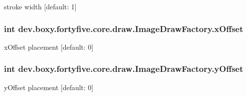 \label{d8/d0b/group___image_draw_ga55543d51eec3d277bc6141062937ac94}
stroke width \mbox{[}default: 1\mbox{]} \hypertarget{group___image_draw_ga6be37b38c2cff42f387e0357b769f6df}{
\subsubsection[{xOffset}]{\setlength{\rightskip}{0pt plus 5cm}int {\bf dev.boxy.fortyfive.core.draw.ImageDrawFactory.xOffset}}}
\label{d8/d0b/group___image_draw_ga6be37b38c2cff42f387e0357b769f6df}
xOffset placement \mbox{[}default: 0\mbox{]} \hypertarget{group___image_draw_ga7013263410dc0d0e0cfe528ce2f10eed}{
\subsubsection[{yOffset}]{\setlength{\rightskip}{0pt plus 5cm}int {\bf dev.boxy.fortyfive.core.draw.ImageDrawFactory.yOffset}}}
\label{d8/d0b/group___image_draw_ga7013263410dc0d0e0cfe528ce2f10eed}
yOffset placement \mbox{[}default: 0\mbox{]} 